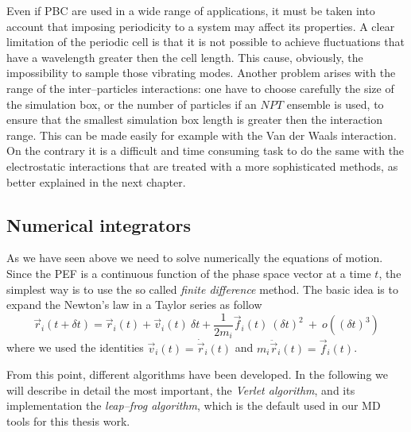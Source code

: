 Even if \ac{PBC} are used in a wide range of applications, it must be taken into account that imposing
periodicity to a system may affect its properties. A clear limitation of the periodic cell is that it is not
possible to achieve fluctuations that have a wavelength greater then the cell length. This cause, obviously, the
impossibility to sample those vibrating modes. Another problem arises with the range of the inter--particles
interactions: one have to choose carefully the size of the simulation box, or the number of particles if an $NPT$
ensemble is used, to ensure that the smallest simulation box length is greater then the interaction range. This
can be made easily for example with the Van der Waals interaction. On the contrary it is a difficult and time
consuming task to do the same with the electrostatic interactions that are treated with a more sophisticated
methods, as better explained in the next chapter.

\subsection{Numerical integrators}
As we have seen above we need to solve numerically the equations of motion. Since the \ac{PEF} is a continuous
function of the phase space vector at a time $t$, the simplest way is to use the so called \textit{finite
difference} method. The basic idea is to expand the Newton's law in a Taylor series as follow
\begin{equation}
	\vec r_i(t + \delta t) = \vec r_i(t) + \vec v_i(t)\ \delta t + \frac{1}{2m_i}\vec f_i(t)\ (\delta t)^2\ +\ o((\delta t)^3)
	\label{eq:newtonTaylor}
\end{equation}
where we used the identities $\vec v_i(t) = \dot{\vec r}_i(t)$ and $m_i\ddot{\vec r}_i(t) = \vec f_i(t)$.

From this point, different algorithms have been developed. In the following we will describe in detail the most
important, the \textit{Verlet algorithm}, and its implementation the \textit{leap--frog algorithm}, which is the
default used in our \ac{MD} tools for this thesis work.

